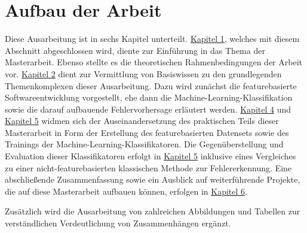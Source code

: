 \section{Aufbau der Arbeit}

Diese Ausarbeitung ist in sechs Kapitel unterteilt. \hyperref[introduction]{Kapitel 1}, welches mit diesem Abschnitt abgeschlossen wird, diente zur Einführung in das Thema der Masterarbeit. Ebenso stellte es die theoretischen Rahmenbedingungen der Arbeit vor. \hyperref[background]{Kapitel 2} dient zur Vermittlung von Basiswissen zu den grundlegenden Themenkomplexen dieser Ausarbeitung. Dazu wird zunächst die featurebasierte Softwareentwicklung vorgestellt, ehe dann die Machine-Learning-Klassifikation sowie die darauf aufbauende Fehlervorhersage erläutert werden. \hyperref[dataset-creation]{Kapitel 4} und \hyperref[training]{Kapitel 5} widmen sich der Auseinandersetzung des praktischen Teils dieser Masterarbeit in Form der Erstellung des featurebasierten Datensets sowie des Trainings der Machine-Learning-Klassifikatoren. Die Gegenüberstellung und Evaluation dieser Klassifikatoren erfolgt in \hyperref[evaluation]{Kapitel 5} inklusive eines Vergleiches zu einer nicht-featurebasierten klassischen Methode zur Fehlererkennung. Eine abschließende Zusammenfassung sowie ein Ausblick auf weiterführende Projekte, die auf diese Masterarbeit aufbauen können, erfolgen in \hyperref[conclusion]{Kapitel 6}.

Zusätzlich wird die Ausarbeitung von zahlreichen Abbildungen und Tabellen zur verständlichen Verdeutlichung von Zusammenhängen ergänzt.

\cleardoublepage
